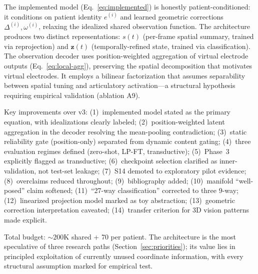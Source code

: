 \documentclass[11pt,letterpaper]{article}
\newcommand{\bfz}{\mathbf{z}}
\begin{document}
The implemented model (Eq.~\ref{eq:implemented}) is honestly patient-conditioned: it conditions on patient identity $e^{(i)}$ and learned geometric corrections $\Delta^{(i)}, \omega^{(i)}$, relaxing the idealized shared observation function. The architecture produces two distinct representations: $s(t)$ (per-frame spatial summary, trained via reprojection) and $\bfz(t)$ (temporally-refined state, trained via classification). The observation decoder uses position-weighted aggregation of virtual electrode outputs (Eq.~\ref{eq:local-agg}), preserving the spatial decomposition that motivates virtual electrodes. It employs a bilinear factorization that assumes separability between spatial tuning and articulatory activation---a structural hypothesis requiring empirical validation (ablation A9).

Key improvements over v3: (1)~implemented model stated as the primary equation, with idealizations clearly labeled; (2)~position-weighted latent aggregation in the decoder resolving the mean-pooling contradiction; (3)~static reliability gate (position-only) separated from dynamic content gating; (4)~three evaluation regimes defined (zero-shot, LP-FT, transductive); (5)~Phase~3 explicitly flagged as transductive; (6)~checkpoint selection clarified as inner-validation, not test-set leakage; (7)~S14 demoted to exploratory pilot evidence; (8)~overclaims reduced throughout; (9)~bibliography added; (10)~manifold ``well-posed'' claim softened; (11)~``27-way classification'' corrected to three 9-way; (12)~linearized projection model marked as toy abstraction; (13)~geometric correction interpretation caveated; (14)~transfer criterion for 3D vision patterns made explicit.

Total budget: ${\sim}200$K shared + 70 per patient. The architecture is the most speculative of three research paths (Section~\ref{sec:priorities}); its value lies in principled exploitation of currently unused coordinate information, with every structural assumption marked for empirical test.
\end{document}
